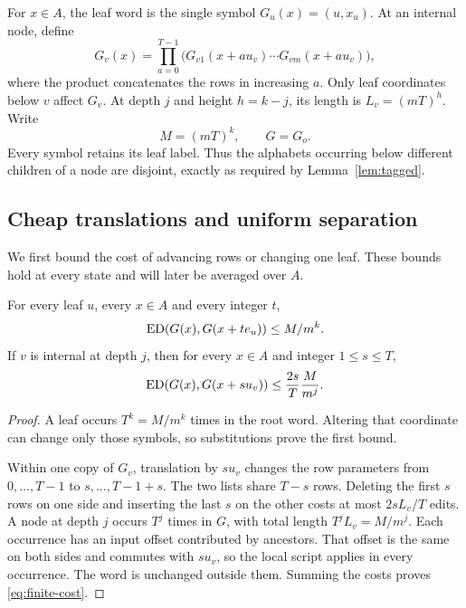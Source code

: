 For $x\in A$, the leaf word is the single symbol $G_u(x)=(u,x_u)$.
At an internal node, define
\begin{equation}\label{eq:finite-word}
 G_v(x)=\prod_{a=0}^{T-1}
 \bigl(G_{v1}(x+a u_v)\cdots G_{vm}(x+a u_v)\bigr),
\end{equation}
where the product concatenates the rows in increasing $a$.
Only leaf coordinates below $v$ affect $G_v$. At depth $j$ and height
$h=k-j$, its length is $L_v=(mT)^h$. Write
\[
 M=(mT)^k,\qquad G=G_o.
\]
Every symbol retains its leaf label. Thus the alphabets occurring
below different children of a node are disjoint, exactly as required by
Lemma~\ref{lem:tagged}.

\subsection{Cheap translations and uniform separation}

We first bound the cost of advancing rows or changing one leaf. These
bounds hold at every state and will later be averaged over $A$.

\begin{lemma}\label{lem:finite-cost}
For every leaf $u$, every $x\in A$ and every integer $t$,
\[
 \operatorname{ED}(G(x),G(x+t e_u))\leq M/m^k.
\]
If $v$ is internal at depth $j$, then for
every $x\in A$ and integer $1\leq s\leq T$,
\begin{equation}\label{eq:finite-cost}
 \operatorname{ED}(G(x),G(x+s u_v))\leq\frac{2s}{T}\frac{M}{m^j}.
\end{equation}
\end{lemma}
\begin{proof}
A leaf occurs $T^k=M/m^k$ times in the root word. Altering that
coordinate can change only those symbols, so substitutions prove the
first bound.

Within one copy of $G_v$, translation by $s u_v$ changes the row
parameters from $0,\ldots,T-1$ to $s,\ldots,T-1+s$. The two lists share
$T-s$ rows. Deleting the first $s$ rows on one side and inserting the
last $s$ on the other costs at most $2sL_v/T$ edits. A node at depth
$j$ occurs $T^j$ times in $G$, with total length $T^jL_v=M/m^j$.
Each occurrence has an input offset contributed by ancestors. That
offset is the same on both sides and commutes with $s u_v$, so the
local script applies in every occurrence. The word is unchanged outside
them. Summing the costs proves \eqref{eq:finite-cost}.
\end{proof}

